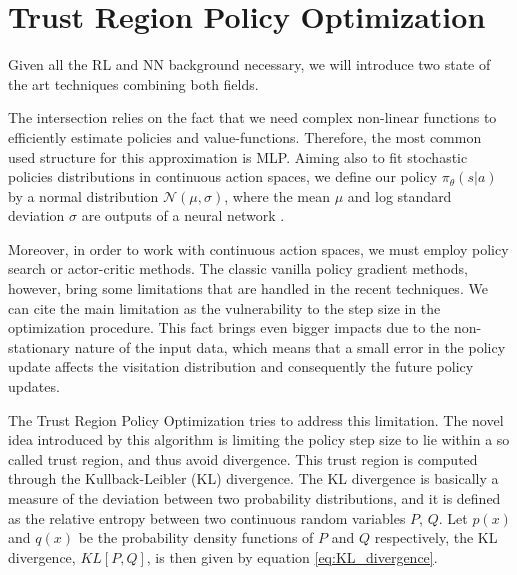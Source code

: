 \section{Trust Region Policy Optimization}

Given all the RL and NN background necessary, we will introduce two state of the art techniques combining both fields.

The intersection relies on the fact that we need complex non-linear functions to efficiently estimate policies and value-functions. Therefore, the most common used structure for this approximation is MLP. Aiming also to fit stochastic policies distributions in continuous action spaces, we define our policy $\pi_{\theta}(s|a)$ by a normal distribution $\mathcal{N}(\mu,\sigma)$, where the mean $\mu$ and log standard deviation $\sigma$ are outputs of a neural network \cite{TRPO}.

Moreover, in order to work with continuous action spaces, we must employ policy search or actor-critic methods. The classic vanilla policy gradient methods, however, bring some limitations that are handled in the recent techniques. We can cite the main limitation as the vulnerability to the step size in the optimization procedure. This fact brings even bigger impacts due to the non-stationary nature of the input data, which means that a small error in the policy update affects the visitation distribution and consequently the future policy updates.


The Trust Region Policy Optimization tries to address this limitation. The novel idea introduced by this algorithm is limiting the policy step size to lie within a so called trust region, and thus avoid divergence. This trust region is computed through the Kullback-Leibler (KL) divergence. The KL divergence is basically a measure of the deviation between two probability distributions, and it is defined as the relative entropy between two continuous random variables $P$, $Q$. Let $p(x)$ and $q(x)$ be the probability density functions of $P$ and $Q$ respectively, the KL divergence, $KL[P,Q]$, is then given by equation \ref{eq:KL_divergence}.

